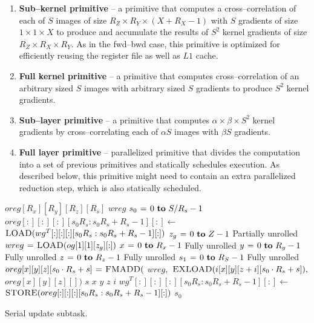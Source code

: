   \begin{enumerate}
    \item {\bf Sub--kernel primitive} -- a primitive that computes a
      cross--correlation of each of $S$ images of size $R_Z \times R_Y
      \times (X + R_X - 1)$ with $S$ gradients of size $1 \times 1
      \times X$ to produce and accumulate the results of $S^2$ kernel
      gradients of size $R_Z \times R_X \times R_Y$.  As in the
      fwd--bwd case, this primitive is optimized for efficiently
      reusing the register file as well as $L1$ cache.
    \item {\bf Full kernel primitive} -- a primitive that computes
      cross--correlation of an arbitrary sized $S$ images with
      arbitrary sized $S$ gradients to produce $S^2$ kernel gradients.
    \item {\bf Sub--layer primitive} -- a primitive that computes
      $\alpha \times \beta \times S^2$ kernel gradients by
      cross--correlating each of $\alpha S$ images with $\beta S$
      gradients.
    \item {\bf Full layer primitive} -- parallelized primitive that
      divides the computation into a set of previous primitives and
      statically schedules execution.  As described below, this
      primitive might need to contain an extra parallelized reduction
      step, which is also statically scheduled.
  \end{enumerate}


  \begin{algorithm}
    {\footnotesize
      \begin{codebox}
        \li {} $oreg[R_x][R_y][R_z][R_s]$
        \li {} $wreg$
        \li \For $s_0 \gets 0 \To S/R_s - 1$
        \li \Do $oreg[:][:][:][s_0R_s:s_0R_s+R_s-1][:] \gets$
        \li   \Do $\textnormal{\scshape LOAD}(wg^T[:][:][:][s_0R_s:s_0R_s+R_s-1][:])$
        \End
        \li \For $z_g \gets 0 \To Z-1$ \Comment Partially unrolled
        \li   \Do $wreg \mathrel{\hspace{1pt}=\hspace{1pt}} \textnormal{\scshape LOAD}(og[1][1][z_g][:])$
        \li   \For $x \gets 0 \To R_x-1$ \Comment Fully unrolled
        \li   \Do \For $y \gets 0 \To R_y-1$  \Comment Fully unrolled
        \li   \Do \For $z \gets 0 \To R_z-1$  \Comment Fully unrolled
        \li   \Do \For $s_1 \gets 0 \To R_S-1$   \Comment Fully unrolled
        \li   \Do $oreg[x][y][z][s_0 \cdot R_s + s] \mathrel{\hspace{1pt}=\hspace{1pt}} \textnormal{\scshape FMADD}($
        \li   \Do $wreg,$
        \li       $\textnormal{\scshape EXLOAD}(i[x][y][z+i][s_0 \cdot R_s + s]),$
        \li       $oreg[x][y][z][])$
        \End
        \End \li {} $s$
        \End \li {} $x$
        \End \li {} $y$
        \End \li {} $z$
        \End \li {} $i$
        \li $wg^T[:][:][:][s_0R_s:s_0R_s+R_s-1][:] \gets$
        \li \Do $\textnormal{\scshape STORE}(oreg[:][:][:][s_0R_s:s_0R_s+R_s-1][:])$
        \End
        \End \li {} $s_0$
      \end{codebox}
    \caption{Serial update subtask.}
    \label{alg:serial-update-subtask}
    }
  \end{algorithm}

